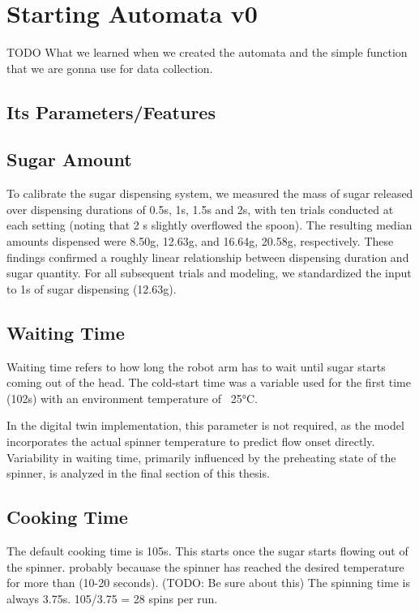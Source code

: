 \section{Starting Automata v0}
TODO What we learned when we created the automata and the simple function that we are gonna use for data collection.
\subsection{Its Parameters/Features}


\subsection{Sugar Amount}\label{subsec:sugar-amount}
To calibrate the sugar dispensing system, we measured the mass of sugar released over dispensing durations of 0.5s, 1s, 1.5s and 2s, with ten trials conducted at each setting (noting that 2 s slightly overflowed the spoon). The resulting median amounts dispensed were 8.50g, 12.63g, and 16.64g, 20.58g, respectively. These findings confirmed a roughly linear relationship between dispensing duration and sugar quantity. For all subsequent trials and modeling, we standardized the input to 1s of sugar dispensing (12.63g).

\subsection{Waiting Time}
Waiting time refers to how long the robot arm has to wait until sugar starts coming out of the head. The cold-start time was a variable used for the first time (102s) with an environment temperature of ~25°C. 

In the digital twin implementation, this parameter is not required, as the model incorporates the actual spinner temperature to predict flow onset directly. Variability in waiting time, primarily influenced by the preheating state of the spinner, is analyzed in the final section of this thesis.

\subsection{Cooking Time}
The default cooking time is 105s. This starts once the sugar starts flowing out of the spinner. probably becauase the spinner has reached the desired temperature for more than (10-20 seconds). (TODO: Be sure about this)
The spinning time is always 3.75s.
105/3.75 = 28 spins per run.


